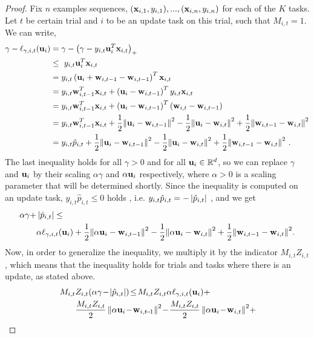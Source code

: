 \begin{proof}
Fix $n$ examples sequences, $(\mathbf{x}_{i,1},y_{i,1}),...,(\mathbf{x}_{i,n},y_{i,n})$ for each of the $K$ tasks. Let $t$ be certain trial and $i$ to be an update task on this trial, such that $M_{i,t}=1.$ We can write,
\begin{align*}
\gamma-\ell_{\gamma,i,t}(\mathbf{u}_i)&=\gamma-\left({\gamma-y_{i,t}\mathbf{u}_i^T\mathbf{x}_{i,t}}\right)_+\\
 ~&\le~  y_{i,t}\mathbf{u}_i^T\mathbf{x}_{i,t} \\
&= y_{i,t}\left({\mathbf{u}_i+\mathbf{w}_{i,t-1}-\mathbf{w}_{i,t-1}}\right)^T\mathbf{x}_{i,t}\\
&= y_{i,t}\mathbf{w}_{i,t-1}^T\mathbf{x}_{i,t}+\left({\mathbf{u}_i-\mathbf{w}_{i,t-1}}\right)^Ty_{i,t}\mathbf{x}_{i,t}\\
&= y_{i,t}\mathbf{w}_{i,t-1}^T\mathbf{x}_{i,t}+\left({\mathbf{u}_i-\mathbf{w}_{i,t-1}}\right)^T\left({\mathbf{w}_{i,t}-\mathbf{w}_{i,t-1}}\right)\\
&=  y_{i,t}\mathbf{w}_{i,t-1}^T\mathbf{x}_{i,t}+\frac{1}{2}{\left\Vert {\mathbf{u}_{i}-\mathbf{w}_{i,t-1}} \right\Vert^2}
        -\frac{1}{2}{\left\Vert {\mathbf{u}_i-\mathbf{w}_{i,t}} \right\Vert^2}+\frac{1}{2}{\left\Vert {\mathbf{w}_{i,t-1}-\mathbf{w}_{i,t}} \right\Vert^2}\\
&=  y_{i,t}\hat{p}_{i,t}+\frac{1}{2}{\left\Vert {\mathbf{u}_{i}-\mathbf{w}_{i,t-1}} \right\Vert^2}
        -\frac{1}{2}{\left\Vert {\mathbf{u}_i-\mathbf{w}_{i,t}} \right\Vert^2}+\frac{1}{2}{\left\Vert {\mathbf{w}_{i,t-1}-\mathbf{w}_{i,t}} \right\Vert^2}~.
\end{align*}
The last inequality holds for all $\gamma>0$ and for all
$\mathbf{u}_i\in\mathbb{R}^d$, so we can replace $\gamma$ and $\mathbf{u}_i$ by their
scaling $\alpha\gamma$ and $\alpha \mathbf{u}_i$ respectively, where $\alpha>0$
is a scaling parameter that will be determined shortly. Since the inequality is computed on an update task,
$y_{i,t}\hat{p}_{i,t}\le0$ holds , i.e. $y_{i,t}\hat{p}_{i,t}=-\left\vert{\hat{p}_{i,t}}\right\vert$ , and we get
\begin{equation*}
\begin{split}
\alpha\gamma  +&\left\vert{\hat{p}_{i,t}}\right\vert \le\\
&\alpha\ell_{\gamma,i,t}(\mathbf{u}_i)+\frac{1}{2}{\left\Vert {\alpha \mathbf{u}_i-\mathbf{w}_{i,t-1}} \right\Vert^2}-\frac{1}{2}{\left\Vert {\alpha \mathbf{u}_i-\mathbf{w}_{i,t}} \right\Vert^2}+\frac{1}{2}{\left\Vert {\mathbf{w}_{i,t-1}-\mathbf{w}_{i,t}} \right\Vert^2} .\end{split}
\end{equation*}
Now, in order to generalize the inequality, we multiply it by the indicator $M_{i,t}Z_{i,t}$ , which means that the inequality holds for  trials and tasks where there is an update, as stated above.
\begin{equation*}
\begin{split}
M_{i,t}&Z_{i,t}{\paren{\alpha\gamma \!-\!\abs{\hat{p}_{i,t}}}} \!\le\! M_{i,t}Z_{i,t}\alpha \lossp{\gamma,i,t}(\vu_i)
+\\ &\frac{M_{i,t}Z_{i,t}}{2}\normt{\alpha \vu_i\!-\!\vwi{i,t\!-\!1}}\!-\!\frac{M_{i,t}Z_{i,t}}{2}\normt{\alpha \vu_i\!-\!\vwiit}\!+\!

\end{split}
\end{equation*}
\end{proof}
